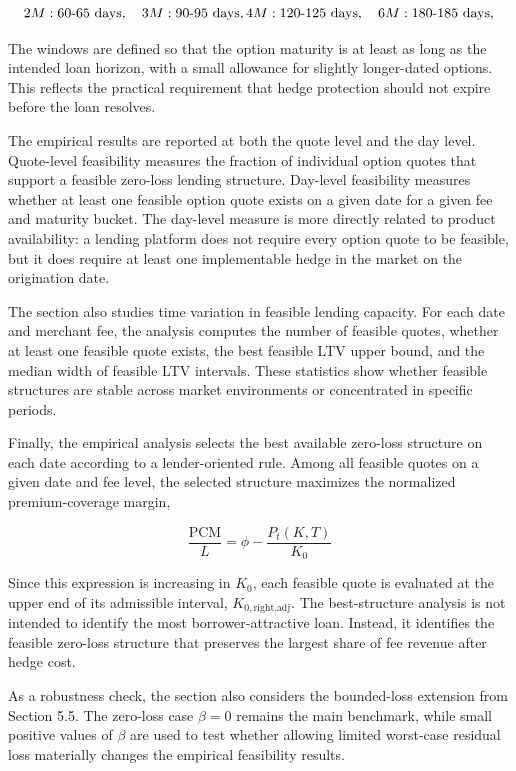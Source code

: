 \documentclass[11pt]{article}
\begin{document}
$$
2M: \text{60-65 days},\quad
3M: \text{90-95 days},\\
4M: \text{120-125 days},\quad
6M: \text{180-185 days},\\
$$

The windows are defined so that the option maturity is at least as long as the intended loan horizon, with a small allowance for slightly longer-dated options. This reflects the practical requirement that hedge protection should not expire before the loan resolves.

The empirical results are reported at both the quote level and the day level. Quote-level feasibility measures the fraction of individual option quotes that support a feasible zero-loss lending structure. Day-level feasibility measures whether at least one feasible option quote exists on a given date for a given fee and maturity bucket. The day-level measure is more directly related to product availability: a lending platform does not require every option quote to be feasible, but it does require at least one implementable hedge in the market on the origination date.

The section also studies time variation in feasible lending capacity. For each date and merchant fee, the analysis computes the number of feasible quotes, whether at least one feasible quote exists, the best feasible LTV upper bound, and the median width of feasible LTV intervals. These statistics show whether feasible structures are stable across market environments or concentrated in specific periods.

Finally, the empirical analysis selects the best available zero-loss structure on each date according to a lender-oriented rule. Among all feasible quotes on a given date and fee level, the selected structure maximizes the normalized premium-coverage margin,

$$
\frac{\text{PCM}}{L} = 
\phi - \frac{P_t(K,T)}{K_0}
$$

Since this expression is increasing in $K_0$, each feasible quote is evaluated at the upper end of its admissible interval, $K_{0,\text{right,adj}}$. The best-structure analysis is not intended to identify the most borrower-attractive loan. Instead, it identifies the feasible zero-loss structure that preserves the largest share of fee revenue after hedge cost.

As a robustness check, the section also considers the bounded-loss extension from Section 5.5. The zero-loss case $\beta=0$ remains the main benchmark, while small positive values of $\beta$ are used to test whether allowing limited worst-case residual loss materially changes the empirical feasibility results.
\end{document}

